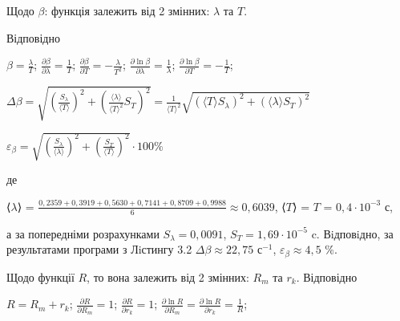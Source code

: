 \documentclass[12pt,a4paper]{article}
\begin{document}
    Щодо $\beta$: функція залежить від 2 змінних: $\lambda$ та $T$.

    Відповідно

    \begin{center}
        $\displaystyle \beta = \frac{\lambda}{T}$; $\displaystyle \frac{\partial \beta}{\partial \lambda} = \frac{1}{T}$; $\displaystyle \frac{\partial \beta}{\partial T} = -\frac{\lambda}{T^2}$;
        $\displaystyle \frac{\partial \ln \beta}{\partial \lambda} = \frac{1}{\lambda}$; $\displaystyle \frac{\partial \ln \beta}{\partial T} = -\frac{1}{T}$;
    \end{center}

    \begin{center}
        $\displaystyle \Delta \beta = \sqrt{\left( \frac{S_{\lambda}}{\text{⟨}T\text{⟩}} \right)^2 + \left( \frac{\text{⟨}\lambda\text{⟩}}{\text{⟨}T\text{⟩}^2} S_T \right)^2} =
        \frac{1}{\text{⟨}T\text{⟩}^2} \sqrt{\left(\text{⟨}T\text{⟩} S_{\lambda}\right)^2 + \left(\text{⟨}\lambda\text{⟩} S_T\right)^2}$
    \end{center}

    \begin{center}
        $\displaystyle \varepsilon_{\beta} = \sqrt{\left( \frac{S_{\lambda}}{\text{⟨}\lambda\text{⟩} }\right)^2 +
        \left(\frac{S_T}{\text{⟨}T\text{⟩}} \right)^2} \cdot 100 \%$
    \end{center}

    де

    \begin{center}
        ⟨$\lambda$⟩ = $\displaystyle \frac{0,2359 + 0,3919 + 0,5630 + 0,7141 + 0,8709 + 0,9988}{6} \approx 0,6039$, ⟨$T$⟩ = $T$ = $0,4 \cdot 10^{-3}$ с,
    \end{center}

    а за попередніми розрахунками $S_{\lambda} = 0,0091$, $S_T = 1,69 \cdot 10^{-5}$ c. Вiдповiдно, за результатами
    програми з Лiстингу 3.2 $\Delta \beta \approx 22,75 \text{ с}^{-1}$, $\varepsilon_{\beta} \approx 4,5$ \%.

    Щодо функції $R$, то вона залежить від 2 змінних: $R_m$ та $r_k$. Відповідно

    \begin{center}
        $\displaystyle R = R_m + r_k$; $\displaystyle \frac{\partial R}{\partial R_m} = 1$; $\displaystyle \frac{\partial R}{\partial r_k} = 1$;
        $\displaystyle \frac{\partial \ln R}{\partial R_m} = \frac{\partial \ln R}{\partial r_k} = \frac{1}{R}$;
    \end{center}
\end{document}
